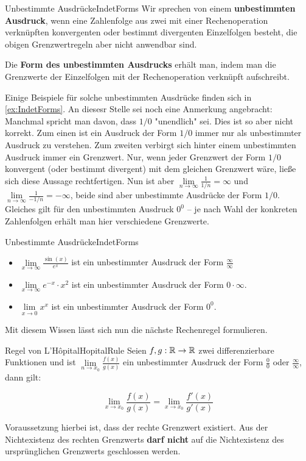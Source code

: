 \begin{definition}{Unbestimmte Ausdrücke}{IndetForms}
	Wir sprechen von einem \textbf{unbestimmten Ausdruck}, wenn eine Zahlenfolge aus zwei mit einer Rechenoperation verknüpften konvergenten oder bestimmt divergenten Einzelfolgen besteht, die obigen Grenzwertregeln aber nicht anwendbar sind.

	Die \textbf{Form des unbestimmten Ausdrucks} erhält man, indem man die Grenzwerte der Einzelfolgen mit der Rechenoperation verknüpft aufschreibt.
\end{definition}

Einige Beispiele für solche unbestimmten Ausdrücke finden sich in \ref{ex:IndetForms}. An diesesr Stelle sei noch eine Anmerkung angebracht: Manchmal spricht man davon, dass $1/0$ "unendlich" sei. Dies ist so aber nicht korrekt. Zum einen ist ein Ausdruck der Form $1/0$ immer nur als unbestimmter Ausdruck zu verstehen. Zum zweiten verbirgt sich hinter einem unbestimmten Ausdruck immer ein Grenzwert. Nur, wenn jeder Grenzwert der Form $1/0$ konvergent (oder bestimmt divergent) mit dem gleichen Grenzwert wäre, ließe sich diese Aussage rechtfertigen. Nun ist aber $\lim\limits_{n\to\infty} \frac{1}{1/n} = \infty$ und $\lim\limits_{n\to\infty} \frac{1}{-1/n} = -\infty$, beide sind aber unbestimmte Ausdrücke der Form $1/0$. Gleiches gilt für den unbestimmten Ausdruck $0^0$ -- je nach Wahl der konkreten Zahlenfolgen erhält man hier verschiedene Grenzwerte.

\begin{example}{Unbestimmte Ausdrücke}{IndetForms}
	\begin{itemize}
		\item $\lim\limits_{x\to\infty} \frac{\sin(x)}{e^x}$ ist ein unbestimmter Ausdruck der Form $\frac{\infty}{\infty}$
		\item $\lim\limits_{x\to\infty} e^{-x} \cdot x^2$ ist ein unbestimmter Ausdruck der Form $0 \cdot \infty$.
		\item $\lim\limits_{x\to 0} x^x$ ist ein unbestimmter Ausdruck der Form $0 ^ 0$.
	\end{itemize}
\end{example}

Mit diesem Wissen lässt sich nun die nächste Rechenregel formulieren.

\begin{statement}{Regel von L'Hôpital}{HopitalRule}
	Seien $f,g: \mathbb{R}\to\mathbb{R}$ zwei differenzierbare Funktionen und ist $\lim\limits_{n\to x_0} \frac{f(x)}{g(x)}$ ein unbestimmter Ausdruck der Form $\frac{0}{0}$ oder $\frac{\infty}{\infty}$, dann gilt:

    \begin{equation}
        \lim\limits_{x \to x_0} \frac{f(x)}{g(x)} = \lim\limits_{x \to x_0} \frac{f'(x)}{g'(x)}
    \end{equation}

    Voraussetzung hierbei ist, dass der rechte Grenzwert existiert. Aus der Nichtexistenz des rechten Grenzwerts \textbf{darf nicht} auf die Nichtexistenz des ursprünglichen Grenzwerts geschlossen werden.
\end{statement}

